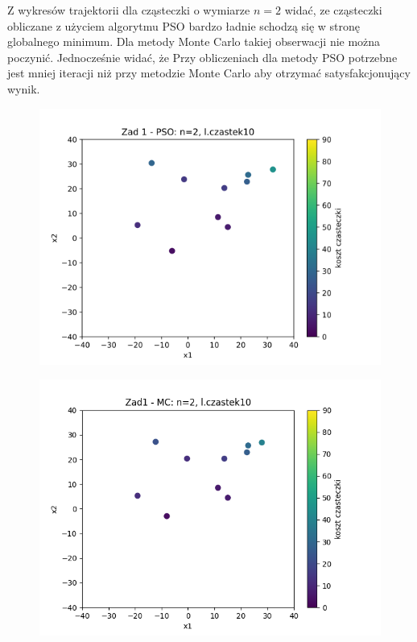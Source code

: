 \documentclass[11pt, a4paper, oneside]{article}
\begin{document}
Z wykresów trajektorii dla cząsteczki o wymiarze $n=2$ widać, ze cząsteczki obliczane z użyciem algorytmu PSO bardzo ładnie schodzą się w stronę globalnego minimum. Dla metody Monte Carlo takiej obserwacji nie można poczynić. Jednocześnie widać, że Przy obliczeniach dla metody PSO potrzebne jest mniej iteracji niż przy metodzie Monte Carlo aby otrzymać satysfakcjonujący wynik.

\begin{figure}[h]
\centering
\begin{minipage}[b]{\dimexpr.5\textwidth-1em}
  \centering
  \includegraphics[width=1\linewidth]{grafiki/Wykresy2d/PSO_zad1_startPositions.png}
  \label{fig:pozycjeStartowe:PSO1}
\end{minipage} \hfill
\begin{minipage}[b]{\dimexpr.5\textwidth-1em}
  \centering
  \includegraphics[width=1\linewidth]{grafiki/Wykresy2d/MC_Zad1_startPositions.png}
  \label{fig:pozycjeStartowe:MC1}
\end{minipage}
\end{figure}
\end{document}
